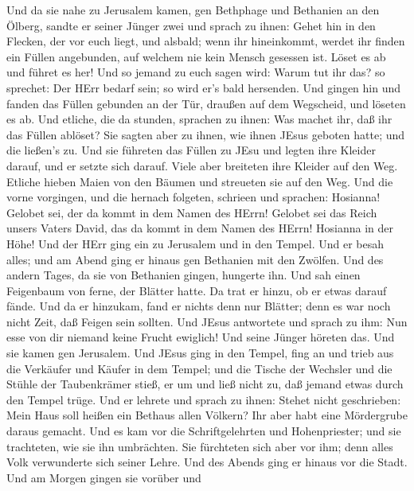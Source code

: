  Und da sie nahe zu Jerusalem kamen, gen Bethphage und
Bethanien an den Ölberg, sandte er seiner Jünger zwei  und
sprach zu ihnen: Gehet hin in den Flecken, der vor euch liegt, und
alsbald; wenn ihr hineinkommt, werdet ihr finden ein Füllen angebunden,
auf welchem nie kein Mensch gesessen ist. Löset es ab und führet es her!
 Und so jemand zu euch sagen wird: Warum tut ihr das? so
sprechet: Der HErr bedarf sein; so wird er's bald hersenden.
 Und gingen hin und fanden das Füllen gebunden an der Tür,
draußen auf dem Wegscheid, und löseten es ab.  Und etliche,
die da stunden, sprachen zu ihnen: Was machet ihr, daß ihr das Füllen
ablöset?  Sie sagten aber zu ihnen, wie ihnen JEsus geboten
hatte; und die ließen's zu.  Und sie führeten das Füllen zu
JEsu und legten ihre Kleider darauf, und er setzte sich darauf.
 Viele aber breiteten ihre Kleider auf den Weg. Etliche
hieben Maien von den Bäumen und streueten sie auf den Weg. 
Und die vorne vorgingen, und die hernach folgeten, schrieen und
sprachen: Hosianna! Gelobet sei, der da kommt in dem Namen des HErrn!
 Gelobet sei das Reich unsers Vaters David, das da kommt in
dem Namen des HErrn! Hosianna in der Höhe!  Und der HErr
ging ein zu Jerusalem und in den Tempel. Und er besah alles; und am
Abend ging er hinaus gen Bethanien mit den Zwölfen.  Und
des andern Tages, da sie von Bethanien gingen, hungerte ihn.
 Und sah einen Feigenbaum von ferne, der Blätter hatte. Da
trat er hinzu, ob er etwas darauf fände. Und da er hinzukam, fand er
nichts denn nur Blätter; denn es war noch nicht Zeit, daß Feigen sein
sollten.  Und JEsus antwortete und sprach zu ihm: Nun esse
von dir niemand keine Frucht ewiglich! Und seine Jünger höreten das.
 Und sie kamen gen Jerusalem. Und JEsus ging in den Tempel,
fing an und trieb aus die Verkäufer und Käufer in dem Tempel; und die
Tische der Wechsler und die Stühle der Taubenkrämer stieß, er um
 und ließ nicht zu, daß jemand etwas durch den Tempel
trüge.  Und er lehrete und sprach zu ihnen: Stehet nicht
geschrieben: Mein Haus soll heißen ein Bethaus allen Völkern? Ihr aber
habt eine Mördergrube daraus gemacht.  Und es kam vor die
Schriftgelehrten und Hohenpriester; und sie trachteten, wie sie ihn
umbrächten. Sie fürchteten sich aber vor ihm; denn alles Volk
verwunderte sich seiner Lehre.  Und des Abends ging er
hinaus vor die Stadt.  Und am Morgen gingen sie vorüber und
